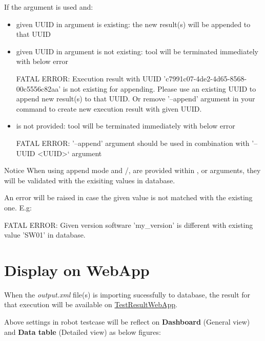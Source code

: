 If the argument  is used and:
\begin{itemize}
  \item given UUID in  argument is existing: the new result(s) will be appended to that UUID
  \item given UUID in  argument is not existing: tool will be terminated immediately with below error
\begin{robotlog}
FATAL ERROR: Execution result with UUID 'c7991c07-4de2-4d65-8568-00c5556c82aa' is not existing for appending.
             Please use an existing UUID to append new result(s) to that UUID.
             Or remove '--append' argument in your command to create new execution result with given UUID.
\end{robotlog}
  \item {} is not provided: tool will be terminated immediately with below error
\begin{robotlog}
FATAL ERROR: '--append' argument should be used in combination with '--UUID <UUID>` argument
\end{robotlog}
\end{itemize} 

\begin{boxhint} {Notice}
When using append mode and /,  are provided within , 
 or  arguments, they will be validated with the exisiting
values in database. 

An error will be raised in case the given value is not matched with the existing one. E.g:
\begin{robotlog}
FATAL ERROR: Given version software 'my_version' is different with existing value 'SW01' in database.
\end{robotlog}
\end{boxhint}

\newpage
\hypertarget{description-display-on-webapp}{%
\section{Display on WebApp}\label{description-display-on-webapp}}

When the \emph{output.xml} file(s) is importing sucessfully to database, the result for that 
execution will be available on
\href{https://github.com/test-fullautomation/testresultwebapp}{TestResultWebApp}.

Above settings in robot testcase will be reflect on \textbf{Dashboard} (General view) and 
\textbf{Data table} (Detailed view) as below figures:

